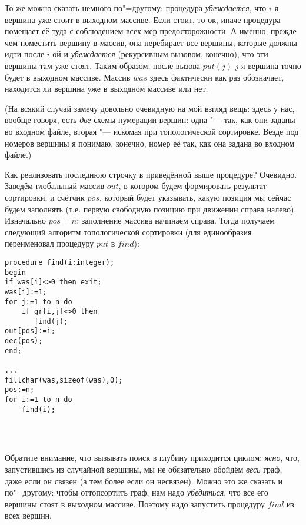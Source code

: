 То же можно сказать немного по"=другому: процедура \textit{убеждается}, что $i$-я  вершина уже 
стоит в выходном массиве. Если стоит, то ок, иначе процедура помещает её туда с соблюдением всех мер 
предосторожности. А именно, прежде чем поместить вершину в массив, она перебирает все вершины, 
которые должны идти после $i$-ой и \textit{убеждается} (рекурсивным вызовом, конечно), что эти 
вершины там уже стоят. Таким образом, после вызова $put(j)$ $j$-я вершина точно будет в выходном 
массиве. Массив $was$ здесь фактически как раз обозначает, находится ли вершина уже в 
выходном массиве или нет.

(На всякий случай замечу довольно очевидную на мой взгляд вещь: здесь у нас, вообще говоря, есть 
\textit{две} схемы нумерации вершин: одна "--- так, как они заданы во входном файле, вторая "--- 
искомая при топологической сортировке. Везде под номеров вершины я понимаю, конечно, номер её так, 
как она задана во входном файле.)

Как реализовать последнюю строчку в приведённой выше процедуре? Очевидно. Заведём глобальный массив 
$out$, в котором будем формировать результат сортировки, и счётчик $pos$, который будет указывать, 
какую позиция мы сейчас будем заполнять (т.е. первую свободную позицию при движении справа налево). 
Изначально $pos=n$: заполнение массива начинаем 
справа. Тогда получаем следующий алгоритм топологической сортировки (для единообразия переименовал 
процедуру $put$ в $find$):
\begin{codesample}\begin{verbatim}
procedure find(i:integer);
begin
if was[i]<>0 then exit;
was[i]:=1;
for j:=1 to n do
    if gr[i,j]<>0 then
       find(j);
out[pos]:=i;
dec(pos);
end;

...
fillchar(was,sizeof(was),0);
pos:=n;
for i:=1 to n do
    find(i);
    
   
       
\end{verbatim}\end{codesample}

Обратите внимание, что вызывать поиск в глубину приходится циклом: \textit{ясно}, что, запустившись из 
случайной вершины, мы не обязательно обойдём \textit{весь} граф, даже если он связен (а тем более 
если он несвязен). Можно это же сказать и по"=другому: чтобы оттопсортить граф, нам надо 
\textit{убедиться}, что все его вершины стоят в выходном массиве. Поэтому надо запустить процедуру 
$find$ из всех вершин.


